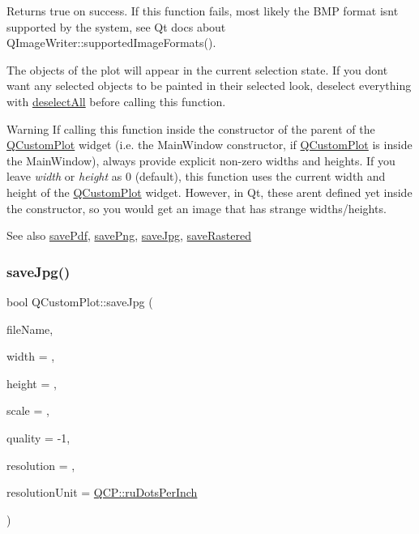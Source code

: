 Returns true on success. If this function fails, most likely the B\+MP format isn\textquotesingle{}t supported by the system, see Qt docs about Q\+Image\+Writer\+::supported\+Image\+Formats().

The objects of the plot will appear in the current selection state. If you don\textquotesingle{}t want any selected objects to be painted in their selected look, deselect everything with \hyperlink{class_q_custom_plot_a9d4808ab925b003054085246c92a257c}{deselect\+All} before calling this function.

\begin{DoxyWarning}{Warning}
If calling this function inside the constructor of the parent of the \hyperlink{class_q_custom_plot}{Q\+Custom\+Plot} widget (i.\+e. the Main\+Window constructor, if \hyperlink{class_q_custom_plot}{Q\+Custom\+Plot} is inside the Main\+Window), always provide explicit non-\/zero widths and heights. If you leave {\itshape width} or {\itshape height} as 0 (default), this function uses the current width and height of the \hyperlink{class_q_custom_plot}{Q\+Custom\+Plot} widget. However, in Qt, these aren\textquotesingle{}t defined yet inside the constructor, so you would get an image that has strange widths/heights.
\end{DoxyWarning}
\begin{DoxySeeAlso}{See also}
\hyperlink{class_q_custom_plot_ad5acd34f6b39c3516887d7e54fec2412}{save\+Pdf}, \hyperlink{class_q_custom_plot_ac92cc9256d12f354b40a4be4600b5fb9}{save\+Png}, \hyperlink{class_q_custom_plot_a76f0d278e630a711fa6f48048cfd83e4}{save\+Jpg}, \hyperlink{class_q_custom_plot_ad7723ce2edfa270632ef42b03a444352}{save\+Rastered} 
\end{DoxySeeAlso}
\mbox{\label{class_q_custom_plot_a76f0d278e630a711fa6f48048cfd83e4}} 
\subsubsection{\texorpdfstring{save\+Jpg()}{saveJpg()}}
{\footnotesize\ttfamily bool Q\+Custom\+Plot\+::save\+Jpg (\begin{DoxyParamCaption}\item[{const Q\+String \&}]{file\+Name,  }\item[{int}]{width = {},  }\item[{int}]{height = {},  }\item[{double}]{scale = {},  }\item[{int}]{quality = {\ttfamily -\/1},  }\item[{int}]{resolution = {},  }\item[{\hyperlink{namespace_q_c_p_a715d46153da230990aa887d0f0602452}{Q\+C\+P\+::\+Resolution\+Unit}}]{resolution\+Unit = {\ttfamily \hyperlink{namespace_q_c_p_a715d46153da230990aa887d0f0602452a9def6fd83de9b4108ad999541a42ac6a}{Q\+C\+P\+::ru\+Dots\+Per\+Inch}} }\end{DoxyParamCaption})}

